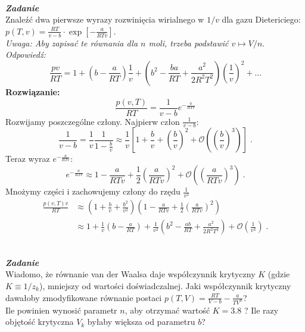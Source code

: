 \documentclass[11pt,a4paper]{article}
\newcounter{zadanie}\newcommand{\zadanie}[1][]{\addtocounter{zadanie}{1} ~\\  {\bf \emph{Zadanie \arabic{zadanie} #1 }} \\}
\begin{document}

\zadanie
Znaleźć dwa pierwsze wyrazy rozwinięcia wirialnego w $1/v$ dla gazu Dietericiego: 
$\displaystyle p(T,v) = \frac{R T}{v-b}\cdot\exp\left[-\frac{a}{R T v}\right]$.\\

{\em Uwaga: Aby zapisać te równania dla $n$ moli, trzeba podstawić $v\mapsto V/n$}.\\

{\it Odpowiedź:}
\[
  \frac{pv}{RT} = 1 + \left(b - \frac{a}{RT} \right) \frac{1}{v} + \left( b^2 - \frac{b a}{R T} + \frac{a^2}{2 R^2 T^2} \right) \left( \frac{1}{v} \right)^2 + ...
\]
\textbf{Rozwiązanie:}
\\
\[
\frac{p(v,T)}{RT} = \frac{1}{v-b}e^{-\frac{a}{RTv}}
\]
Rozwijamy poszczególne człony. Najpierw człon $\frac{1}{v-b}$:
\[
\frac{1}{v-b} = \frac{1}{v}\frac{1}{1-\frac{b}{v}} \approx \frac{1}{v}\left[ 1 + \frac{b}{v} +\left( \frac{b}{v} \right)^2 + \mathcal{O}\left( \left( \frac{b}{v} \right)^3 \right) \right] \; .
\]
Teraz wyraz $e^{-\frac{a}{RTv}}$:
\[
e^{-\frac{a}{RTv}} \approx 1 - \frac{a}{RTv} + \frac{1}{2} \left( \frac{a}{RTv} \right)^2 + \mathcal{O}\left( \left( \frac{a}{RTv} \right)^3 \right) \; .
\]
Mnożymy części i zachowujemy człony do rzędu $\frac{1}{v^2}$
\begin{align*}
    \frac{p(v,T) v }{RT} &\approx \left( 1 + \frac{b}{v} +  \frac{b^2}{v^2} \right ) \left( 1 - \frac{a}{RTv} + \frac{1}{2} \left( \frac{a}{RTv} \right)^2 \right) \\
    &\approx 1 + \frac{1}{v}\left( b - \frac{a}{RT} \right) + \frac{1}{v^2} \left( b^2 - \frac{ab}{RT} + \frac{a^2}{2R^2 T^2}\right) + \mathcal{O}\left( \frac{1}{v^3} \right) \; .
\end{align*}
\newpage


\zadanie
Wiadomo, że równanie van der Waalsa daje współczynnik krytyczny $K$
(gdzie $K\equiv 1/z_k$), mniejszy od wartości doświadczalnej.
Jaki współczynnik krytyczny dawałoby zmodyfikowane równanie
postaci
\linebreak
\mbox{$\displaystyle p(T,V) = \frac{R T}{V-b} - \frac{a}{T V^n}$}? \\
Ile powinien wynosić parametr $n$, aby otrzymać  wartość
$K = 3.8$ ?
Ile razy objętość krytyczna $V_k$
byłaby większa od parametru $b$? \\
\end{document}
